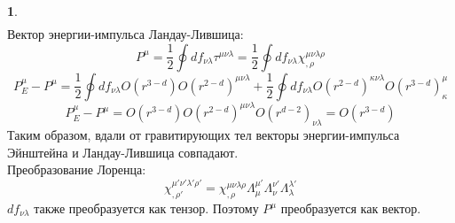 \documentclass[12pt]{article}
\theoremstyle{definition}
\newtheorem{zad}{}[section]
\begin{document}
\begin{zad}
\begin{multline}
\end{multline}
Вектор энергии-импульса Ландау-Лившица:
\begin{equation}
    P^\mu=\frac{1}{2}\oint df_{\nu\lambda}\tau^{\mu\nu\lambda}=\frac{1}{2}\oint df_{\nu\lambda}\chi^{\mu\nu\lambda\rho}_{,\rho}
\end{equation}
\begin{equation}
    P^\mu_E-P^\mu=\frac{1}{2}\oint df_{\nu\lambda}O(r^{3-d})O(r^{2-d})^{\mu\nu\lambda}+\frac{1}{2}\oint df_{\nu\lambda}O(r^{2-d})^{\kappa\nu\lambda}O(r^{3-d})^\mu_\kappa
\end{equation}
\begin{equation}
    \boxed{P^\mu_E-P^\mu=O(r^{3-d})O(r^{2-d})^{\mu\nu\lambda}O(r^{d-2})_{\nu\lambda}=O(r^{3-d})}
\end{equation}
Таким образом, вдали от гравитирующих тел векторы энергии-импульса Эйнштейна и Ландау-Лившица совпадают.\\
Преобразование Лоренца:
\begin{equation}
    \chi^{\mu'\nu'\lambda'\rho'}_{,\rho'}=\chi^{\mu\nu\lambda\rho}_{,\rho}\Lambda_\mu^{\mu'}\Lambda_\nu^{\nu'}\Lambda_\lambda^{\lambda'}
\end{equation}
$df_{\nu\lambda}$ также преобразуется как тензор. Поэтому $P^\mu$ преобразуется как вектор.
\end{zad}
\end{document}
